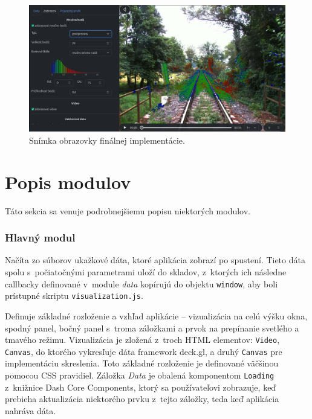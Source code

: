 \begin{figure}[h]
    \centering
    \includegraphics[width=1\linewidth]{text_prace/obrazky-figures/screenshot.png}
    \caption{Snímka obrazovky finálnej implementácie.}
    \label{fig:screenshot}
\end{figure}

\section{Popis modulov}

Táto sekcia sa venuje podrobnejšiemu popisu niektorých modulov.

\subsubsection{Hlavný modul }

Načíta zo súborov ukažkové dáta, ktoré aplikácia zobrazí po spustení. Tieto dáta spolu s~počiatočnými parametrami uloží do skladov, z~ktorých ich následne callbacky definované v~module \emph{data} kopírujú do objektu \texttt{window}, aby boli prístupné skriptu \texttt{visualization.js}.

Definuje základné rozloženie a vzhľad aplikácie -- vizualizácia na celú výšku okna, spodný panel, bočný panel s~troma záložkami a prvok na prepínanie svetlého a tmavého režimu. Vizualizácia je zložená z~troch HTML elementov: \texttt{Video}, \texttt{Canvas}, do ktorého vykresľuje dáta framework deck.gl, a druhý \texttt{Canvas} pre implementáciu skreslenia. Toto základné rozloženie je definované väčšinou pomocou CSS pravidiel. Záložka \emph{Data} je obalená komponentom \texttt{Loading} z~knižnice Dash Core Components, ktorý sa používateľovi zobrazuje, keď prebieha aktualizácia niektorého prvku z~tejto záložky, teda keď aplikácia nahráva dáta.


